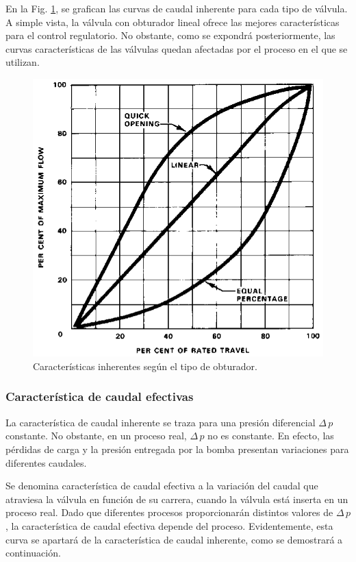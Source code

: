 En la Fig. \ref{fig:caractInherente}, se grafican las curvas de caudal
inherente para cada tipo de válvula.
A simple vista, la válvula con obturador lineal ofrece las mejores
características para el control regulatorio.
No obstante, como se expondrá posteriormente, las curvas características de las
válvulas quedan afectadas por el proceso en el que se utilizan.

\begin{figure}[t]
 \centering
 \includegraphics[scale=1.43]{Cap2-DisenoEnsamblado/images/Inherente.png}
 \caption{Características inherentes según el tipo de obturador.}
 \label{fig:caractInherente}
\end{figure}


\subsubsection{Característica de caudal efectivas}

La característica de caudal inherente se traza para una presión diferencial
$\Delta \,p$ constante.
No obstante, en un proceso real, $\Delta \,p$ no es constante.
En efecto, las pérdidas de carga y la presión entregada por la bomba presentan
variaciones para diferentes caudales.

Se denomina característica de caudal efectiva a la variación del
caudal que atraviesa la válvula en función de su carrera, cuando la
válvula está inserta en un proceso real.
Dado que diferentes procesos proporcionarán distintos valores de  $\Delta
\,p$, la característica de caudal efectiva depende del proceso.
Evidentemente, esta curva se apartará de la característica de caudal inherente,
como se demostrará a continuación.

